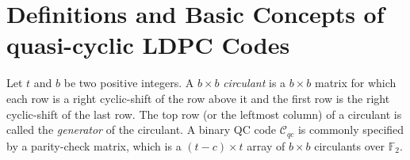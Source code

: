 \documentclass[journal,draftclsnofoot,onecolumn,12pt,twoside]{IEEEtran}
\newtheorem{Definition}{Definition}
\begin{document}
\section{ Definitions and Basic Concepts of quasi-cyclic LDPC Codes}\label{sec3}
Let $t$ and $b$ be two positive integers. A $b\times b$ \emph{circulant} is a $b\times b$ matrix for which each row is a right cyclic-shift of the row above it and the first row is the right cyclic-shift of the last row. The top row (or the leftmost column) of a circulant is called the \emph{generator} of the circulant.
%
%
A binary QC code $\mathcal{C}_{qc}$ is commonly specified by a parity-check matrix, which is a $(t - c)\times t$ array of $b\times b$ circulants over $\mathbb{F}_2$.
\end{document}
